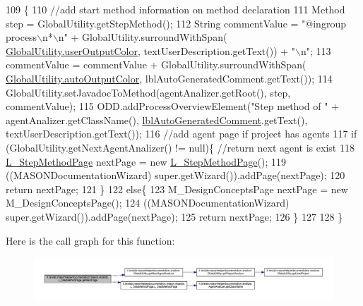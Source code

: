 \begin{DoxyCode}
109                                     \{ 
110         \textcolor{comment}{//add start method information on method declaration}
111         Method step = GlobalUtility.getStepMethod();
112         String commentValue = \textcolor{stringliteral}{"@ingroup process\(\backslash\)n*\(\backslash\)n"} + GlobalUtility.surroundWithSpan(
      \hyperlink{classit_1_1isislab_1_1masonhelperdocumentation_1_1analizer_1_1_global_utility_aec864cd710b27ece609c5a6093211ff4}{GlobalUtility.userOutputColor}, textUserDescription.getText()) + \textcolor{stringliteral}{"\(\backslash\)n"};
113         commentValue = commentValue + GlobalUtility.surroundWithSpan(
      \hyperlink{classit_1_1isislab_1_1masonhelperdocumentation_1_1analizer_1_1_global_utility_a42aa676ad1ff27c42cd4aab651ff2a35}{GlobalUtility.autoOutputColor}, lblAutoGeneratedComment.getText());
114         GlobalUtility.setJavadocToMethod(agentAnalizer.getRoot(), step, commentValue);
115         ODD.addProcessOverviewElement(\textcolor{stringliteral}{"Step method of "} + agentAnalizer.getClassName(), 
      \hyperlink{classit_1_1isislab_1_1masonhelperdocumentation_1_1mason_1_1wizards_1_1_l___step_method_page_af9b2ba2f488b5e92c1e8745127d3162c}{lblAutoGeneratedComment}.getText(), textUserDescription.getText());
116         \textcolor{comment}{//add agent page if project has agents}
117         \textcolor{keywordflow}{if} (GlobalUtility.getNextAgentAnalizer() != null)\{  \textcolor{comment}{//return next agent is exist}
118             \hyperlink{classit_1_1isislab_1_1masonhelperdocumentation_1_1mason_1_1wizards_1_1_l___step_method_page_ae63b8fc92a263e94bef137135e5f47da}{L\_StepMethodPage} nextPage = \textcolor{keyword}{new} \hyperlink{classit_1_1isislab_1_1masonhelperdocumentation_1_1mason_1_1wizards_1_1_l___step_method_page_ae63b8fc92a263e94bef137135e5f47da}{L\_StepMethodPage}();
119             ((MASONDocumentationWizard) super.getWizard()).addPage(nextPage);
120             \textcolor{keywordflow}{return} nextPage;
121         \}
122         \textcolor{keywordflow}{else}\{
123             M\_DesignConceptsPage nextPage = \textcolor{keyword}{new} M\_DesignConceptsPage();
124             ((MASONDocumentationWizard) super.getWizard()).addPage(nextPage);
125             \textcolor{keywordflow}{return} nextPage;
126         \}
127         
128     \}
\end{DoxyCode}


Here is the call graph for this function\-:\nopagebreak
\begin{figure}[H]
\begin{center}
\leavevmode
\includegraphics[width=350pt]{classit_1_1isislab_1_1masonhelperdocumentation_1_1mason_1_1wizards_1_1_l___step_method_page_a3aa5cb9ab01aceaa78dd1294d9e5f330_cgraph}
\end{center}
\end{figure}



